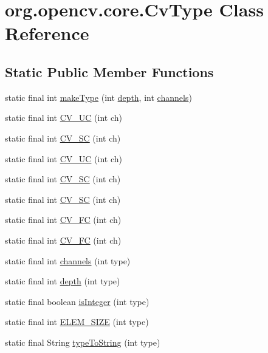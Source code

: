 \hypertarget{classorg_1_1opencv_1_1core_1_1_cv_type}{}\section{org.\+opencv.\+core.\+Cv\+Type Class Reference}
\label{classorg_1_1opencv_1_1core_1_1_cv_type}
\subsection*{Static Public Member Functions}
\begin{DoxyCompactItemize}
\item 
static final int \mbox{\hyperlink{classorg_1_1opencv_1_1core_1_1_cv_type_af5ce97eb63ff19c07f0e4c6b83817afe}{make\+Type}} (int \mbox{\hyperlink{classorg_1_1opencv_1_1core_1_1_cv_type_a710eca3bbca56ebae903a99372233927}{depth}}, int \mbox{\hyperlink{classorg_1_1opencv_1_1core_1_1_cv_type_a42dd36ab62b214f3cd845d8b8553de45}{channels}})
\item 
static final int \mbox{\hyperlink{classorg_1_1opencv_1_1core_1_1_cv_type_ac747e0c4781d8cd6549d7526c8239aa4}{C\+V\+\_\+UC}} (int ch)
\item 
static final int \mbox{\hyperlink{classorg_1_1opencv_1_1core_1_1_cv_type_a3a2b68795debc8025d150ba248d3676b}{C\+V\+\_\+SC}} (int ch)
\item 
static final int \mbox{\hyperlink{classorg_1_1opencv_1_1core_1_1_cv_type_ad2a421c2e200fb31b3e4d0fd10d5766f}{C\+V\+\_\+UC}} (int ch)
\item 
static final int \mbox{\hyperlink{classorg_1_1opencv_1_1core_1_1_cv_type_aae48c342f211fd13ad3b4318e5c3f800}{C\+V\+\_\+SC}} (int ch)
\item 
static final int \mbox{\hyperlink{classorg_1_1opencv_1_1core_1_1_cv_type_a837617694c08ee05906a2a9f7b134164}{C\+V\+\_\+SC}} (int ch)
\item 
static final int \mbox{\hyperlink{classorg_1_1opencv_1_1core_1_1_cv_type_a160153e6ecadee9af0db1b6843c1ccca}{C\+V\+\_\+FC}} (int ch)
\item 
static final int \mbox{\hyperlink{classorg_1_1opencv_1_1core_1_1_cv_type_a2dbccbf9146a3e2bd5eaaffecd5f0dc7}{C\+V\+\_\+FC}} (int ch)
\item 
static final int \mbox{\hyperlink{classorg_1_1opencv_1_1core_1_1_cv_type_a42dd36ab62b214f3cd845d8b8553de45}{channels}} (int type)
\item 
static final int \mbox{\hyperlink{classorg_1_1opencv_1_1core_1_1_cv_type_a710eca3bbca56ebae903a99372233927}{depth}} (int type)
\item 
static final boolean \mbox{\hyperlink{classorg_1_1opencv_1_1core_1_1_cv_type_af3d10f238716061a59bbfbdf33a8381e}{is\+Integer}} (int type)
\item 
static final int \mbox{\hyperlink{classorg_1_1opencv_1_1core_1_1_cv_type_abb3bee15c58488632425b98a128027e5}{E\+L\+E\+M\+\_\+\+S\+I\+ZE}} (int type)
\item 
static final String \mbox{\hyperlink{classorg_1_1opencv_1_1core_1_1_cv_type_a05bd21aec071d41e00555f32f85683a3}{type\+To\+String}} (int type)
\end{DoxyCompactItemize}
